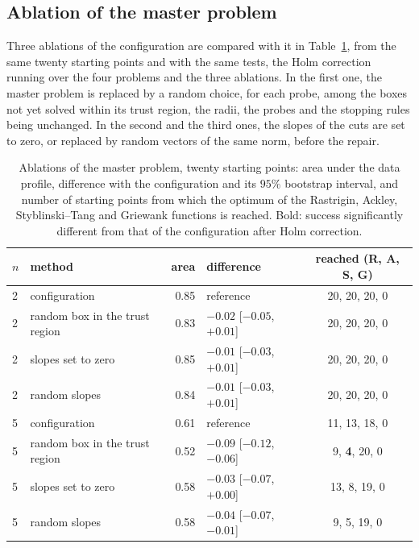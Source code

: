 \documentclass[pdflatex,sn-basic]{sn-jnl}
\begin{document}
\subsection{Ablation of the master problem}\label{sec:ablation}

Three ablations of the configuration are compared with it in
Table~\ref{tab:ablation}, from the same twenty starting points and with the
same tests, the Holm correction running over the four problems and the three
ablations. In the first one, the master problem is replaced by a random choice,
for each probe, among the boxes not yet solved within its trust region, the
radii, the probes and the stopping rules being unchanged. In the second and the
third ones, the slopes of the cuts are set to zero, or replaced by random
vectors of the same norm, before the repair.

\begin{table}[t]
  \centering
  \caption{Ablations of the master problem, twenty starting points: area under
    the data profile, difference with the configuration and its $95\%$
    bootstrap interval, and number of starting points from which the optimum of
    the Rastrigin, Ackley, Styblinski--Tang and Griewank functions is reached.
    Bold: success significantly different from that of the configuration after
    Holm correction.}
  \label{tab:ablation}
  \scriptsize
  \setlength{\tabcolsep}{2.5pt}
  \begin{tabular}{llrlc}
    \toprule
    $n$ & method & area & difference & reached (R, A, S, G) \\
    \midrule
    2 & configuration                  & 0.85 & reference                  & 20, 20, 20, 0 \\
    2 & random box in the trust region & 0.83 & $-0.02$ [$-0.05$, $+0.01$] & 20, 20, 20, 0 \\
    2 & slopes set to zero             & 0.85 & $-0.01$ [$-0.03$, $+0.01$] & 20, 20, 20, 0 \\
    2 & random slopes                  & 0.84 & $-0.01$ [$-0.03$, $+0.01$] & 20, 20, 20, 0 \\
    \midrule
    5 & configuration                  & 0.61 & reference                  & 11, 13, 18, 0 \\
    5 & random box in the trust region & 0.52 & $-0.09$ [$-0.12$, $-0.06$] & 9, \textbf{4}, 20, 0 \\
    5 & slopes set to zero             & 0.58 & $-0.03$ [$-0.07$, $+0.00$] & 13, 8, 19, 0 \\
    5 & random slopes                  & 0.58 & $-0.04$ [$-0.07$, $-0.01$] & 9, 5, 19, 0 \\
    \bottomrule
  \end{tabular}
\end{table}
\end{document}
